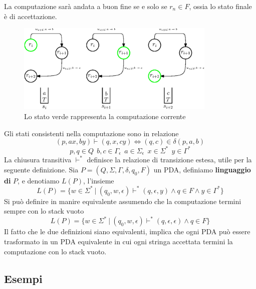 \documentclass[10pt, letterpaper]{report}
\begin{document}
La computazione sarà andata a buon fine se e solo se $r_n\in F$, ossia lo stato finale è di accettazione.\begin{center}
    \begin{figure}[h!]
        \centering 
        \includegraphics[width=0.85\textwidth ]{images/pda1.eps}
        \caption{Lo stato verde rappresenta la computazione corrente}
        \label{fig:pdaComp}
    \end{figure}
\end{center}
Gli stati consistenti nella computazione sono in relazione 
$$ (p,ax,by)\vdash (q,x,cy)\iff (q,c)\in\delta(p,a,b)$$
$$ p,q\in Q\  \ b,c\in\Gamma_\epsilon\ \ a\in\Sigma_\epsilon\ \ x\in\Sigma^* \ \ y\in\Gamma^*$$
La chiusura transitiva $\vdash^*$ definisce la relazione di transizione estesa, utile per la seguente 
definizione.\acc 
{} Sia $P=(Q,\Sigma,\Gamma,\delta,q_0,F)$ un PDA, definiamo \textbf{linguaggio di }$P$, e denotiamo $L(P)$, 
l'insieme $$L(P)=\{w\in\Sigma^* \ | \ (q_0,w,\epsilon)\vdash^* (q,\epsilon,y) \land q\in F\land y\in\Gamma^*\} $$
Si può definire in manire equivalente assumendo che la computazione termini sempre 
con lo stack vuoto 
$$L(P)=\{w\in\Sigma^* \ | \ (q_0,w,\epsilon)\vdash^* (q,\epsilon,\epsilon) \land q\in F\} $$
Il fatto che le due definizioni siano equivalenti, implica che ogni PDA può essere trasformato in un PDA equivalente 
in cui ogni stringa accettata termini la computazione con lo stack vuoto.
\subsection{Esempi}
\end{document}
